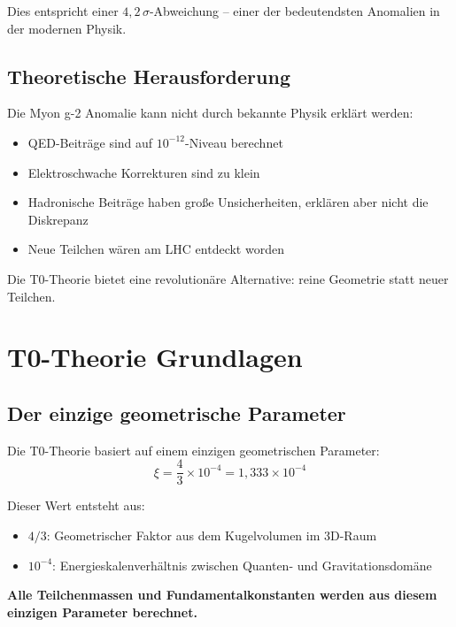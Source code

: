 \documentclass[12pt,a4paper]{article}
\numberwithin{equation}{section}
\begin{document}
	Dies entspricht einer $4{,}2\,\sigma$-Abweichung -- einer der bedeutendsten Anomalien in der modernen Physik.
	
	\subsection{Theoretische Herausforderung}
	
	Die Myon g-2 Anomalie kann nicht durch bekannte Physik erkl\"art werden:
	\begin{itemize}
		\item QED-Beitr\"age sind auf $10^{-12}$-Niveau berechnet
		\item Elektroschwache Korrekturen sind zu klein
		\item Hadronische Beitr\"age haben gro\ss{}e Unsicherheiten, erkl\"aren aber nicht die Diskrepanz
		\item Neue Teilchen w\"aren am LHC entdeckt worden
	\end{itemize}
	
	Die T0-Theorie bietet eine revolution\"are Alternative: reine Geometrie statt neuer Teilchen.
	
	\section{T0-Theorie Grundlagen}
	
	\subsection{Der einzige geometrische Parameter}
	
	\begin{t0wichtig}
		Die T0-Theorie basiert auf einem einzigen geometrischen Parameter:
		\begin{equation}
			\xi = \frac{4}{3} \times 10^{-4} = 1{,}333 \times 10^{-4}
		\end{equation}
		
		Dieser Wert entsteht aus:
		\begin{itemize}
			\item $4/3$: Geometrischer Faktor aus dem Kugelvolumen im 3D-Raum
			\item $10^{-4}$: Energieskalenverh\"altnis zwischen Quanten- und Gravitationsdom\"ane
		\end{itemize}
		
		\textbf{Alle Teilchenmassen und Fundamentalkonstanten werden aus diesem einzigen Parameter berechnet.}
	\end{t0wichtig}
	
\end{document}
